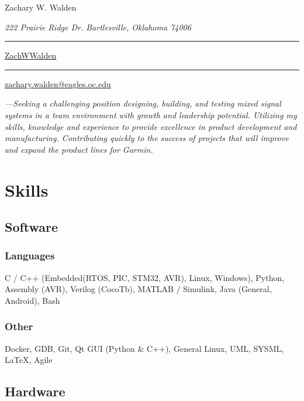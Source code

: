 \documentclass{article}
\newcommand\mybar{\kern1pt\rule[-\dp\strutbox]{.8pt}{\baselineskip}\kern1pt}
\begin{document}
\begin{center}
	\begin{Huge}
		Zachary W. Walden\\
	\end{Huge}
	\begin{large}
		\textsl{222 Prairie Ridge Dr. Bartlesville, Oklahoma 74006}\\
	\end{large}
	\begin{normalsize}
		 \mybar { } \faGithub \href{https://github.com/ZachWWalden}{ ZachWWalden}
		\mybar { }\faEnvelope\href{mailto::zachary.walden@eagles.oc.edu}{ zachary.walden@eagles.oc.edu}
	\end{normalsize}
\end{center}
\begin{spacing}{.5}

\begin{adjustwidth}{30pt}{30pt}
	\textit{\large{---Seeking a challenging position designing, building, and testing mixed signal systems in a team environment with growth and leadership potential. Utilizing my skills, knowledge and experience to provide excellence in product development and manufacturing.
	Contributing quickly to the success of projects that will improve and expand the product lines for Garmin.}}
\end{adjustwidth}

\section{Skills}
	\subsection{Software}
		\subsubsection{Languages} \large{ C / C++} \small{(Embedded(RTOS, PIC, STM32, AVR), Linux, Windows),}\large{ Python, Assembly} \small{(AVR),} \large{ Verilog} \small{(CocoTb),} \hspace*{.45cm}\large{ MATLAB / Simulink, Java} \small{(General, Android),} \large{ Bash}
		\subsubsection{Other} \large{ Docker, GDB, Git, Qt GUI} \small{(Python \& C++),} \large{ General Linux, UML, SYSML, \LaTeX, Agile}
	\subsection{Hardware}

\end{spacing}
\end{document}
